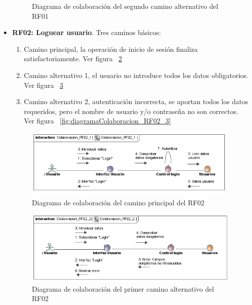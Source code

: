 \begin{itemize}
\begin{figure} [!htb]
		\caption{Diagrama de colaboración del segundo camino alternativo del RF01}
		\label{fig:diagramaColaboracion_RF01_3}
	\end{figure}
	
	\FloatBarrier
	\item \textbf{RF02: Loguear usuario}. Tres caminos básicos: 
	\begin{enumerate}
		\item Camino principal, la operación de inicio de sesión finaliza satisfactoriamente. Ver figura ~\ref{fig:diagramaColaboracion_RF02_1}
		\item Camino alternativo 1, el usuario no introduce todos los datos obligatorios. Ver figura ~\ref{fig:diagramaColaboracion_RF02_2}
		\item Camino alternativo 2, autenticación incorrecta, se aportan todos los datos requeridos, pero el nombre de usuario y/o contraseña no son correctos. Ver figura ~\ref{fig:diagramaColaboracion_RF02_3}
	\end{enumerate}
	\begin{figure} [!htb]
		\centering
		\includegraphics[width=\linewidth,height=\textheight,keepaspectratio]{Images/Diagramas/04_Colaboracion_RF02_1}
		\caption{Diagrama de colaboración del camino principal del RF02}
		\label{fig:diagramaColaboracion_RF02_1}
	\end{figure}
	\begin{figure} [!htb]
		\centering
		\includegraphics[width=\linewidth,height=\textheight,keepaspectratio]{Images/Diagramas/04_Colaboracion_RF02_2}
		\caption{Diagrama de colaboración del primer camino alternativo del RF02}
		\label{fig:diagramaColaboracion_RF02_2}

\end{figure}
\end{itemize}
